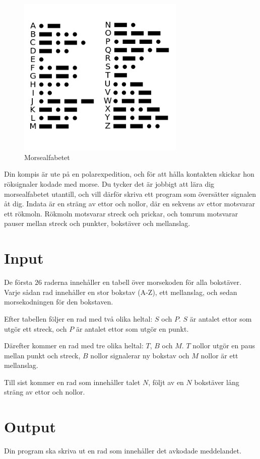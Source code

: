 
\begin{figure}[h] 
\begin{center}
\includegraphics[width=8cm]{morse.png}
\caption{Morsealfabetet}
\end{center} 
\end{figure}

Din kompis är ute på en polarexpedition, och för att hålla kontakten skickar hon röksignaler kodade med morse. Du tycker det är jobbigt att lära dig morsealfabetet utantill, och vill därför skriva ett program som översätter signalen åt dig. Indata är en sträng av ettor och nollor, där en sekvens av ettor motsvarar ett rökmoln. Rökmoln motsvarar streck och prickar, och tomrum motsvarar pauser mellan streck och punkter, bokstäver och mellanslag.

\section*{Input}
De första $26$ raderna innehåller en tabell över morsekoden för alla bokstäver.
Varje sådan rad innehåller en stor bokstav (A-Z), ett mellanslag, och sedan morsekodningen för den bokstaven.

Efter tabellen följer en rad med två olika heltal: $S$ och $P$.
$S$ är antalet ettor som utgör ett streck, och $P$ är antalet ettor som utgör en punkt.

Därefter kommer en rad med tre olika heltal: $T$, $B$ och $M$.
$T$ nollor utgör en paus mellan punkt och streck, $B$ nollor signalerar ny bokstav och $M$ nollor är ett mellanslag.

Till sist kommer en rad som innehåller talet $N$, följt av en $N$ bokstäver lång sträng av ettor och nollor.

\section*{Output}
Din program ska skriva ut en rad som innehåller det avkodade meddelandet.

